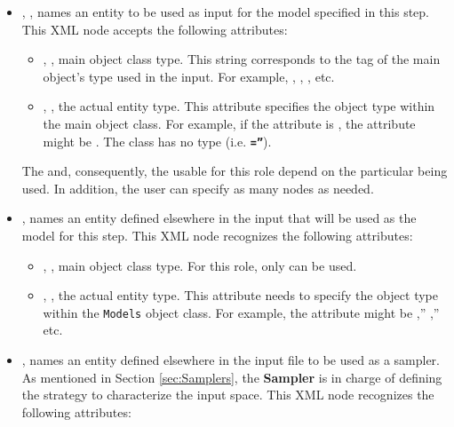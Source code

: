 \begin{itemize}
\item {}, , names an entity to
be used as input for the model specified in this step.
This XML node accepts the following attributes:
\begin{itemize}
  \item {}, , main object class
    type.
    This string corresponds to the tag of the main object's type used in the
    input.
    For example, , , ,
    etc.
  \item {}, , the actual entity
    type.
    This attribute specifies the object type within the main object class.
    For example, if the   attribute is , the 
     attribute might be .
    \nb The class  has no type (i.e.
    \textbf{\texttt{=''}}).
\end{itemize}
\nb The  and, consequently, the  usable for this
role depend on the particular  being used.
In addition, the user can specify as many  nodes as needed.
\item {},  names an entity 
defined elsewhere in the input that will be used as the model for this step.
This XML node recognizes the following attributes:
\begin{itemize}
  \item {}, , main object class
    type.
    For this role, only  can be used.
  \item {}, , the actual entity
    type.
    This attribute needs to specify the object type within the \texttt{Models}
    object class.
    For example, the  attribute might be ,'' 
    ,'' etc.
\end{itemize}
\item {},  names an entity
defined elsewhere in the input file to be used as a sampler.
As mentioned in Section \ref{sec:Samplers}, the \textbf{Sampler} is in charge of
defining the strategy to characterize the input space.
This XML node recognizes the following attributes:
\begin{itemize}

\end{itemize}
\end{itemize}
